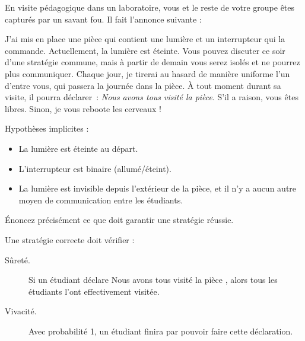 
\begingroup

\begin{exercice}
  \label{exo:introduction/mad_scientist}

  En visite pédagogique dans un laboratoire, vous et le reste de votre groupe êtes 
  capturés par un savant fou. Il fait l'annonce suivante :

  \og
  J'ai mis en place une pièce qui contient une lumière et un interrupteur
  qui la commande. Actuellement, la lumière est éteinte.
  Vous pouvez discuter ce soir d'une stratégie commune, mais à partir de demain
  vous serez isolés et ne pourrez plus communiquer.
  Chaque jour, je tirerai au hasard de manière uniforme l'un d'entre vous, qui passera la journée dans la pièce.
  À tout moment durant sa visite, il pourra déclarer~: \emph{Nous avons tous visité la pièce}.
  S'il a raison, vous êtes libres. Sinon, je vous reboote les cerveaux !
  \fg

  Hypothèses implicites :
  \begin{itemize}
  \item La lumière est éteinte au départ.
  \item L'interrupteur est binaire (allumé/éteint).
  \item La lumière est invisible depuis l'extérieur de la pièce,
    et il n'y a aucun autre moyen de communication entre les étudiants.
  \end{itemize}
  
  \begin{questions}
  \item Énoncez précisément ce que doit garantir une stratégie réussie.
  \end{questions}
  \begin{corrections}
    Une stratégie correcte doit vérifier :
    \begin{description}
    \item[Sûreté.] Si un étudiant déclare \og Nous avons tous visité la pièce \fg,
      alors tous les étudiants l'ont effectivement visitée.
    \item[Vivacité.] Avec probabilité 1, un étudiant finira par pouvoir faire cette déclaration.
    \end{description}
  \end{corrections}
  

\end{exercice}
